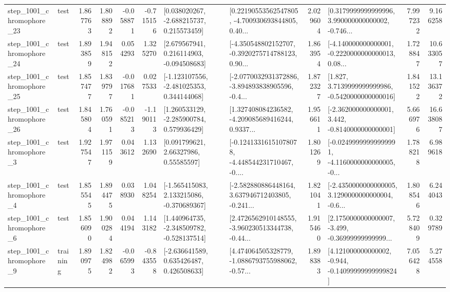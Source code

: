 \begin{tabular}{llrrrrllrlrr}
 step\_1001\_chromophore\_23 &      test &      1.867763 &    1.808892 &     -0.058871 & -0.715156 &    [0.038020267, -2.688215737, 0.215573459] &  [0.22190553562547805, -4.700930693844805, 0.40... &       2.029604 &  [0.3179999999999996, 3.990000000000002, -0.746... &            7.997232 &          9.166258 \\
 step\_1001\_chromophore\_24 &      test &      1.893859 &    1.948152 &      0.054293 &  1.325270 &    [2.679567941, 0.216114903, -0.094508683] &  [-4.350548802152707, -0.3920275714788123, 0.90... &       1.863954 &  [-4.140000000000001, -0.2220000000000013, 0.08... &            1.728847 &         10.633057 \\
 step\_1001\_chromophore\_25 &      test &      1.857477 &    1.839797 &     -0.017681 &  0.027533 &   [-1.123107556, -2.481025353, 0.344144068] &  [-2.0770032931372886, -3.894893838905596, -0.4... &       1.872327 &   [1.827, 3.7139999999999986, -0.5420000000000016] &            1.841522 &         13.136372 \\
 step\_1001\_chromophore\_26 &      test &      1.845804 &    1.760591 &     -0.085213 & -1.190113 &    [1.260533129, -2.285900784, 0.579936429] &  [1.327408084236582, -4.209085689416244, 0.9337... &       1.956611 &   [-2.362000000000001, 3.442, -0.8140000000000001] &            5.666976 &         16.638087 \\
  step\_1001\_chromophore\_3 &      test &      1.927547 &    1.971159 &      0.043612 &  1.132690 &       [0.091799621, 2.66327986, 0.55585597] &  [-0.12413316151078078, -4.448544231710467, -0.... &       1.801269 &  [-0.02499999999999991, -4.1160000000000005, -0... &            1.788218 &          6.989618 \\
  step\_1001\_chromophore\_4 &      test &      1.855545 &    1.894475 &      0.038930 &  1.048254 &   [-1.565415083, 2.133215086, -0.370689367] &  [-2.582880886448164, 3.637946712403805, -0.241... &       1.821041 &  [-2.4350000000000005, 3.1290000000000004, -0.6... &            1.808546 &          6.244043 \\
  step\_1001\_chromophore\_6 &      test &      1.856090 &    1.900284 &      0.044194 &  1.143182 &   [1.440964735, -2.348509782, -0.528137514] &  [2.4726562910148555, -3.960230513344738, -0.44... &       1.915460 &  [2.1750000000000007, -3.499, -0.36999999999999... &            5.728409 &          0.329789 \\
  step\_1001\_chromophore\_9 &  training &      1.890975 &    1.824982 &     -0.065993 & -0.843558 &    [-2.636641589, 0.635426487, 0.426508633] &  [4.474064505328779, -1.0886793755988062, -0.57... &       1.898383 &  [4.121000000000002, -0.944, -0.14099999999999824] &            7.056428 &          5.274558 \\

\end{tabular}
